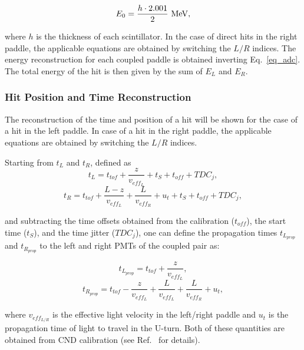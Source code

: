 \begin{equation}
\label{eq_def_e0}
E_0=\frac{h\cdot 2.001}{2}~{\rm MeV},
\end{equation}

\noindent
where $h$ is the thickness of each scintillator. In the case of direct hits in the right paddle, the applicable equations
are obtained by switching the $L/R$ indices. The energy reconstruction for each coupled paddle is obtained inverting
Eq.~\ref{eq_adc}. The total energy of the hit is then given by the sum of $E_L$ and $E_R$.

\subsubsection{Hit Position and Time Reconstruction}

The reconstruction of the time and position of a hit will be shown for the case of a hit in the left paddle. In case
of a hit in the right paddle, the applicable equations are obtained by switching the $L/R$ indices.

Starting from $t_L$ and $t_R$, defined as
\begin{equation}
\label{eq_time_hit}
t_L = t_{tof} +\frac{z}{v_{eff_L}} +t_S + t_{off} + TDC_j,
\end{equation}
\begin{equation}
t_R = t_{tof} + \frac{L-z}{v_{eff_L}} + \frac{L}{v_{eff_R}} + u_t + t_S + t_{off} + TDC_j,\nonumber
\end{equation}

\noindent
and subtracting the time offsets obtained from the calibration ($t_{off}$), the start time ($t_S$), and the time
jitter ($TDC_j$), one can define the propagation times $t_{L_{prop}}$ and $t_{R_{prop}}$ to the left and right
PMTs of the coupled pair as:

\begin{equation}
t_{L_{prop}} = t_{tof} + \frac{z}{v_{eff_L}},
\end{equation}
\begin{equation}
t_{R_{prop}} = t_{tof} - \frac{z}{v_{eff_L}} + \frac{L}{v_{eff_L}} + \frac{L}{v_{eff_R}} + u_t,\nonumber
\end{equation}

\noindent
where $v_{eff_{L/R}}$ is the effective light velocity in the left/right paddle and $u_t$ is the propagation time of
light to travel in the U-turn. Both of these quantities are obtained from CND calibration (see Ref.~\cite{cnd-nim}
for details).

